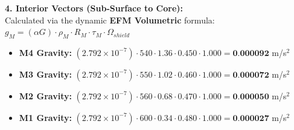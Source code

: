 \documentclass[11pt, a4paper]{article}
\begin{document}
  \vspace{0.5em}
  \noindent \textbf{4. Interior Vectors (Sub-Surface to Core):} \\[0.5em]
  \hspace*{1em} Calculated via the dynamic \textbf{EFM Volumetric} formula: $g_M = (\alpha G) \cdot \rho_{M} \cdot R_M \cdot \tau_M \cdot \Omega_{shield}$
  \begin{itemize}
    \item \textbf{M4 Gravity:} $(2.792 \times 10^{-7}) \cdot 540 \cdot 1.36 \cdot 0.450 \cdot 1.000 = \textbf{0.000092}$ m/s$^2$
    \item \textbf{M3 Gravity:} $(2.792 \times 10^{-7}) \cdot 550 \cdot 1.02 \cdot 0.460 \cdot 1.000 = \textbf{0.000072}$ m/s$^2$
    \item \textbf{M2 Gravity:} $(2.792 \times 10^{-7}) \cdot 560 \cdot 0.68 \cdot 0.470 \cdot 1.000 = \textbf{0.000050}$ m/s$^2$
    \item \textbf{M1 Gravity:} $(2.792 \times 10^{-7}) \cdot 600 \cdot 0.34 \cdot 0.480 \cdot 1.000 = \textbf{0.000027}$ m/s$^2$
  \end{itemize}
\end{document}
